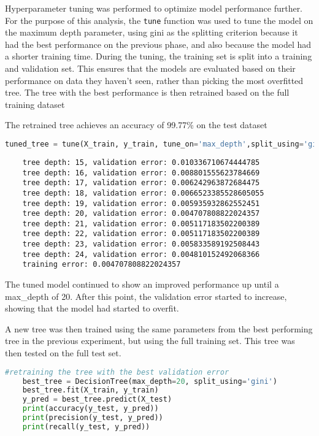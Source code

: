 \documentclass{article}
\begin{document}
Hyperparameter tuning was performed to optimize model performance further. For the purpose of this analysis, the \texttt{tune} function was used to tune the model on the maximum depth parameter, using gini as the splitting criterion because it had the best performance on the previous phase, and also because the model had a shorter training time. During the tuning, the training set is split into a training and validation set. This ensures that the models are evaluated based on their performance on data they haven't seen, rather than picking the most overfitted tree. The tree with the best performance is then retrained based on the full training dataset

The retrained tree achieves an accuracy of 99.77\% on the test dataset

\begin{lstlisting}[language=Python, caption=Hyperparameter Tuning, label=code:hyperparameter_tuning]
tuned_tree = tune(X_train, y_train, tune_on='max_depth',split_using='gini', start=15, stop=25)
\end{lstlisting}

\begin{lstlisting}
    tree depth: 15, validation error: 0.010336710674444785
    tree depth: 16, validation error: 0.008801555623784669
    tree depth: 17, validation error: 0.006242963872684475
    tree depth: 18, validation error: 0.0066523385528605055
    tree depth: 19, validation error: 0.005935932862552451
    tree depth: 20, validation error: 0.004707808822024357
    tree depth: 21, validation error: 0.005117183502200389
    tree depth: 22, validation error: 0.005117183502200389
    tree depth: 23, validation error: 0.005833589192508443
    tree depth: 24, validation error: 0.004810152492068366
    training error: 0.004707808822024357
\end{lstlisting}

The tuned model continued to show an improved performance up until a max\_depth of 20. After this point, the validation error started to increase, showing that the model had started to overfit.

A new tree was then trained using the same parameters from the best performing tree in the previous experiment, but using the full training set. This tree was then tested on the full test set.
\begin{lstlisting}[language=Python, caption=Retraining the best tree, label=code:retraining_tuned_tree]
    #retraining the tree with the best validation error
    best_tree = DecisionTree(max_depth=20, split_using='gini')
    best_tree.fit(X_train, y_train)
    y_pred = best_tree.predict(X_test)
    print(accuracy(y_test, y_pred))
    print(precision(y_test, y_pred))
    print(recall(y_test, y_pred))
\end{lstlisting}
\end{document}
